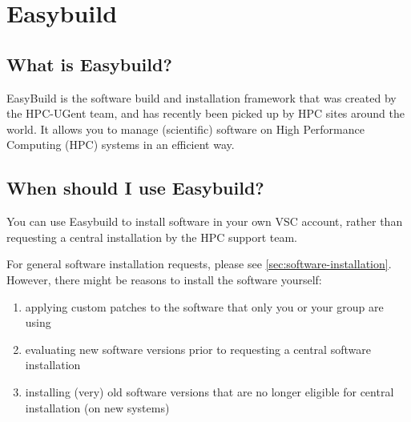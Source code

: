 \chapter{Easybuild}
\label{ch:easybuild}

\section{What is Easybuild?}

EasyBuild is the software build and installation framework that was created by the HPC-UGent
team, and has recently been picked up by HPC sites around the world. It allows you to manage
(scientific) software on High Performance Computing (HPC) systems in an efficient way.

\section{When should I use Easybuild?}

You can use Easybuild to install software in your own VSC account, rather than
requesting a central installation by the HPC support team.

For general software installation requests, please see \autoref{sec:software-installation}. However,
there might be reasons to install the software yourself:

\begin{enumerate}
    \item applying custom patches to the software that only you or your group are using
    \item evaluating new software versions prior to requesting a central software installation
    \item installing (very) old software versions that are no longer eligible for central installation (on new systems)
\end{enumerate}
